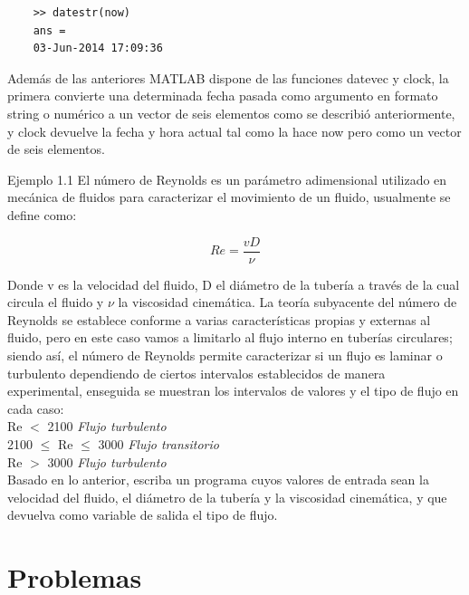 \begin{verbatim}
	>> datestr(now)
	ans =
	03-Jun-2014 17:09:36
\end{verbatim}

Además de las anteriores MATLAB dispone de las funciones datevec y clock, la primera 
convierte una determinada fecha pasada como argumento en formato string o numérico a 
un vector de seis elementos como se describió anteriormente, y clock devuelve la fecha 
y hora actual tal como la hace now pero  como un vector de seis elementos.




\begin{ejemplo}{Ejemplo 1.1}
El número de Reynolds es un parámetro adimensional utilizado en mecánica de fluidos para caracterizar el
movimiento de un fluido, usualmente se define como:

$$ Re=\frac{vD}{\nu} $$

Donde v es la velocidad del fluido, D el diámetro de la tubería a través de la cual circula el fluido y $\nu$ la
viscosidad cinemática. La teoría subyacente del número de Reynolds se establece conforme a varias
características propias y externas al fluido, pero en este caso vamos a limitarlo al flujo interno en tuberías
circulares; siendo así, el número de Reynolds permite caracterizar si un flujo es laminar o turbulento
dependiendo de ciertos intervalos establecidos de manera experimental, enseguida se muestran los intervalos
de valores y el tipo de flujo en cada caso:\\

Re $<$ 2100  \textit{Flujo turbulento}\\
2100 $\leq$ Re $\leq$ 3000   \textit{Flujo transitorio}\\
Re $>$ 3000    \textit{Flujo turbulento}\\

Basado en lo anterior, escriba un programa cuyos valores de entrada sean la velocidad del fluido, el diámetro
de la tubería y la viscosidad cinemática, y que devuelva como variable de salida el tipo de flujo.
\end{ejemplo}




\section*{Problemas}

